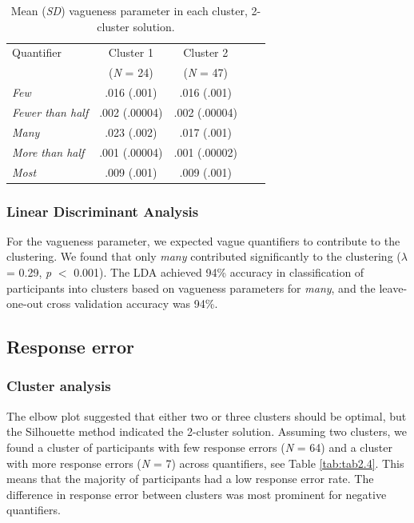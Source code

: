 \documentclass{article}
\begin{document}
\begin{table}[H]
    \centering
    \caption{Mean (\textit{SD}) vagueness parameter in each cluster, 2-cluster solution. }
    \label{tab:tab2.3}
    \begin{tabular}{lcccc}\hline
         Quantifier & Cluster 1 & Cluster 2 \\
          & (\textit{N} = 24) & (\textit{N} = 47) \\
         \hline
         \textit{Few} & .016 (.001) & .016 (.001)\\
         \textit{Fewer than half} & .002 (.00004) & .002 (.00004)\\
         \textit{Many} & .023 (.002) & .017 (.001)\\
         \textit{More than half} & .001 (.00004) & .001 (.00002)\\
         \textit{Most} & .009 (.001) & .009 (.001)\\ \hline
    \end{tabular}
\end{table}

\subsubsection{Linear Discriminant Analysis}
For the vagueness parameter, we expected vague quantifiers to contribute to the clustering. We found that only \textit{many} contributed significantly to the clustering ($\lambda$ = 0.29, \textit{p} $<$ 0.001). The LDA achieved 94\% accuracy in classification of participants into clusters based on vagueness parameters for \textit{many}, and the leave-one-out cross validation accuracy was 94\%.

\subsection{Response error}\label{appendix:ch3.3}
\subsubsection{Cluster analysis}
The elbow plot suggested that either two or three clusters should be optimal, but the Silhouette method indicated the 2-cluster solution. Assuming two clusters, we found a cluster of participants with few response errors (\textit{N} = 64) and a cluster with more response errors (\textit{N} = 7) across quantifiers, see Table \ref{tab:tab2.4}. This means that the majority of participants had a low response error rate. The difference in response error between clusters was most prominent for negative quantifiers. %
\end{document}
